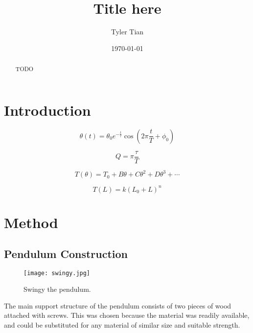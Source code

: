\documentclass[aps,twocolumn,secnumarabic,nobalancelastpage,amsmath,amssymb,nofootinbib,floatfix,letterpaper]{revtex4}
\begin{document}
\title{Title here}
\author{Tyler Tian}
\noaffiliation
\date{\today}


\begin{abstract}
TODO
\end{abstract}

\maketitle


\section{Introduction}

\begin{equation}
    \theta(t) = \theta_0 e^{-\frac{t}{\tau}}\cos\left(2\pi\frac{t}{T} + \phi_0\right)
    \label{eqn:model}
\end{equation}

\begin{equation}
    Q = \pi\frac{\tau}{T}
    \label{eqn:qfactor}
\end{equation}

\begin{equation}
    T(\theta) = T_0 + B\theta + C\theta^2 + D\theta^3 + \cdots
    \label{eqn:power_series}
\end{equation}

\begin{equation}
    T(L) = k(L_0 + L)^n
    \label{eqn:period}
\end{equation}


\section{Method}

\subsection{Pendulum Construction}

\begin{figure}[htb]
    \texttt{[image: swingy.jpg]}
    \caption{Swingy the pendulum.}
    \label{fig:swingy}
\end{figure}

The main support structure of the pendulum consists of two pieces of wood attached with screws.
This was chosen because the material was readily available, and could be substituted for any material of
similar size and suitable strength.
\end{document}

